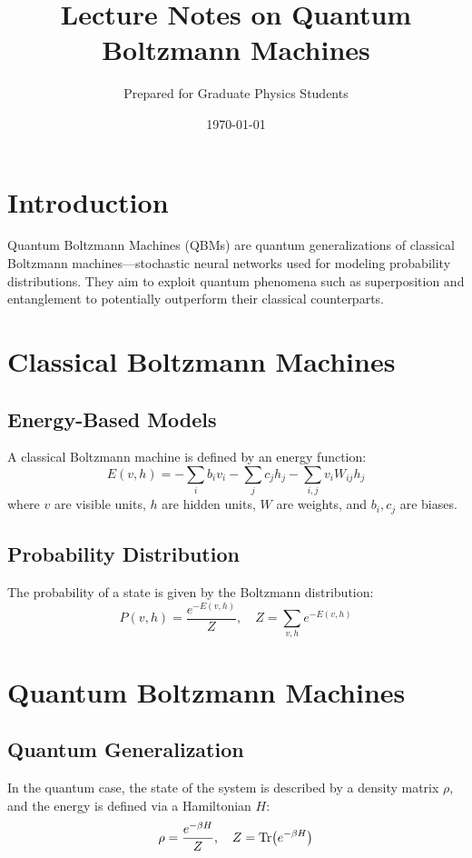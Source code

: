 \documentclass[12pt]{article}
\title{Lecture Notes on Quantum Boltzmann Machines}
\author{Prepared for Graduate Physics Students}
\date{\today}
\begin{document}
\maketitle

\tableofcontents
\newpage

\section{Introduction}

Quantum Boltzmann Machines (QBMs) are quantum generalizations of classical Boltzmann machines—stochastic neural networks used for modeling probability distributions. They aim to exploit quantum phenomena such as superposition and entanglement to potentially outperform their classical counterparts.

\section{Classical Boltzmann Machines}

\subsection{Energy-Based Models}

A classical Boltzmann machine is defined by an energy function:
\[
E(v, h) = -\sum_i b_i v_i - \sum_j c_j h_j - \sum_{i,j} v_i W_{ij} h_j
\]
where \( v \) are visible units, \( h \) are hidden units, \( W \) are weights, and \( b_i, c_j \) are biases.

\subsection{Probability Distribution}

The probability of a state is given by the Boltzmann distribution:
\[
P(v, h) = \frac{e^{-E(v,h)}}{Z}, \quad Z = \sum_{v,h} e^{-E(v,h)}
\]

\section{Quantum Boltzmann Machines}

\subsection{Quantum Generalization}

In the quantum case, the state of the system is described by a density matrix \( \rho \), and the energy is defined via a Hamiltonian \( H \):
\[
\rho = \frac{e^{-\beta H}}{Z}, \quad Z = \Tr(e^{-\beta H})
\]
\end{document}
